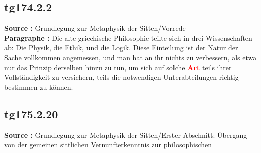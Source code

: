 \documentclass[a4paper,12pt,twoside]{book}
\newcommand{\match}[1]{\textcolor{red}{\textbf{#1}}}
\begin{document}
	\subsection*{tg174.2.2} 
	\textbf{Source : }Grundlegung zur Metaphysik der Sitten/Vorrede\\  
	
	\noindent\textbf{Paragraphe : }Die alte griechische Philosophie teilte sich in drei Wissenschaften ab: Die Physik, die Ethik, und die Logik. Diese Einteilung ist der Natur der Sache vollkommen angemessen, und man hat an ihr nichts zu verbessern, als etwa nur das Prinzip derselben hinzu zu tun, um sich auf solche \match{Art} teils ihrer Vollständigkeit zu versichern, teils die notwendigen Unterabteilungen richtig bestimmen zu können. 
	
	\subsection*{tg175.2.20} 
	\textbf{Source : }Grundlegung zur Metaphysik der Sitten/Erster Abschnitt: Übergang von der gemeinen sittlichen Vernunfterkenntnis zur philosophischen\\  
	
\end{document}
